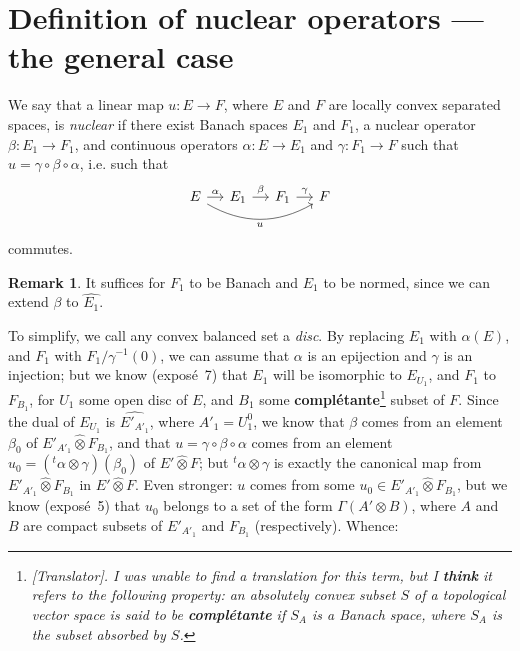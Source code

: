 \documentclass{article}
\theoremstyle{plain}
\theoremstyle{definition}
\newtheorem*{remark}{Remark}
\newenvironment{definition}[1]
    {\renewcommand\theinnercustomdefinition{#1}\innercustomdefinition}
    {\endinnercustomdefinition}
\newcommand{\cotimes}{\widehat{\otimes}}
\newcommand{\transpose}[1]{{}^t\!{#1}}
\begin{document}
\section{Definition of nuclear operators — the general case}
\label{section4}

\begin{definition}{2}
\label{definition2}
  We say that a linear map $u\colon E\to F$, where $E$ and $F$ are locally convex separated spaces, is \emph{nuclear} if there exist Banach spaces $E_1$ and $F_1$, a nuclear operator $\beta\colon E_1\to F_1$, and continuous operators $\alpha\colon E\to E_1$ and $\gamma\colon F_1\to F$ such that $u=\gamma\circ\beta\circ\alpha$, i.e. such that
  \[
    \begin{tikzcd}[column sep=small]
      E \ar[r,"\alpha"] \ar[rrr,bend right,swap,"u"]
      & E_1 \ar[r,"\beta"]
      & F_1 \ar[r,"\gamma"]
      & F
    \end{tikzcd}
  \]
  commutes.
\end{definition}

\begin{remark}
  It suffices for $F_1$ to be Banach and $E_1$ to be normed, since we can extend $\beta$ to $\widehat{E_1}$.
\end{remark}

To simplify, we call any convex balanced set a \emph{disc}.
By replacing $E_1$ with $\alpha(E)$, and $F_1$ with $F_1/\gamma^{-1}(0)$, we can assume that $\alpha$ is an epijection and $\gamma$ is an injection;
but we know (expos\'{e}~7) that $E_1$ will be isomorphic to $E_{U_1}$, and $F_1$ to $F_{B_1}$, for $U_1$ some open disc of $E$, and $B_1$ some \textbf{compl\'{e}tante}\footnote{\emph{[Translator]. I was unable to find a translation for this term, but I \textbf{think} it refers to the following property: an absolutely convex subset $S$ of a topological vector space is said to be \textbf{compl\'{e}tante} if $S_A$ is a Banach space, where $S_A$ is the subset absorbed by $S$.}} subset of $F$.
Since the dual of $E_{U_1}$ is $\widehat{E'_{A'_1}}$, where $A'_1=U_1^0$, we know that $\beta$ comes from an element $\beta_0$ of $E'_{A'_1}\cotimes F_{B_1}$, and that $u=\gamma\circ\beta\circ\alpha$ comes from an element $u_0=(\transpose{\alpha}\otimes\gamma)(\beta_0)$ of $E'\cotimes F$;
but $\transpose{\alpha}\otimes\gamma$ is exactly the canonical map from $E'_{A'_1}\cotimes F_{B_1}$ in $E'\cotimes F$.
Even stronger: $u$ comes from some $u_0\in E'_{A'_1}\cotimes F_{B_1}$, but we know (expos\'{e}~5) that $u_0$ belongs to a set of the form $\Gamma(A'\otimes B)$, where $A$ and $B$ are compact subsets of $E'_{A'_1}$ and $F_{B_1}$ (respectively).
Whence:
\end{document}
